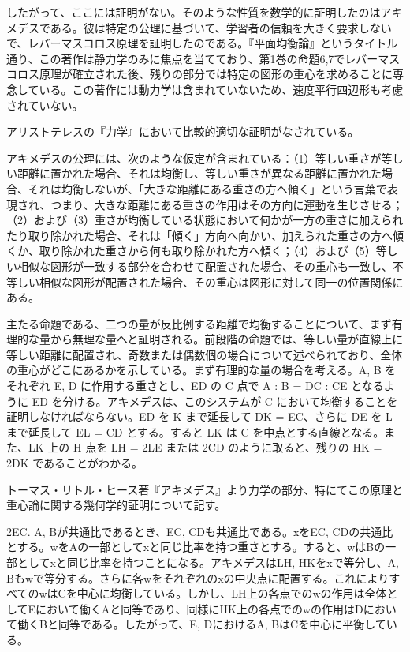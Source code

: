 \documentclass[a4paper,11pt,openany]{ltjsbook}
\begin{document}
したがって、ここには証明がない。そのような性質を数学的に証明したのはアキメデスである。彼は特定の公理に基づいて、学習者の信頼を大きく要求しないで、レバーマスコロス原理を証明したのである。『平面均衡論』というタイトル通り、この著作は静力学のみに焦点を当てており、第1巻の命題6,7でレバーマスコロス原理が確立された後、残りの部分では特定の図形の重心を求めることに専念している。この著作には動力学は含まれていないため、速度平行四辺形も考慮されていない。

アリストテレスの『力学』において比較的適切な証明がなされている。

アキメデスの公理には、次のような仮定が含まれている：（1）等しい重さが等しい距離に置かれた場合、それは均衡し、等しい重さが異なる距離に置かれた場合、それは均衡しないが、「大きな距離にある重さの方へ傾く」という言葉で表現され、つまり、大きな距離にある重さの作用はその方向に運動を生じさせる；（2）および（3）重さが均衡している状態において何かが一方の重さに加えられたり取り除かれた場合、それは「傾く」方向へ向かい、加えられた重さの方へ傾くか、取り除かれた重さから何も取り除かれた方へ傾く；（4）および（5）等しい相似な図形が一致する部分を合わせて配置された場合、その重心も一致し、不等しい相似な図形が配置された場合、その重心は図形に対して同一の位置関係にある。

主たる命題である、二つの量が反比例する距離で均衡することについて、まず有理的な量から無理な量へと証明される。前段階の命題では、等しい量が直線上に等しい距離に配置され、奇数または偶数個の場合について述べられており、全体の重心がどこにあるかを示している。まず有理的な量の場合を考える。A, B をそれぞれ E, D に作用する重さとし、ED の C 点で A : B = DC : CE となるように ED を分ける。アキメデスは、このシステムが C において均衡することを証明しなければならない。ED を K まで延長して DK = EC、さらに DE を L まで延長して EL = CD とする。すると LK は C を中点とする直線となる。また、LK 上の H 点を LH = 2LE または 2CD のように取ると、残りの HK = 2DK であることがわかる。

トーマス・リトル・ヒース著『アキメデス』より力学の部分、特にてこの原理と重心論に関する幾何学的証明について記す。

2EC. A, Bが共通比であるとき、EC, CDも共通比である。xをEC, CDの共通比とする。wをAの一部としてxと同じ比率を持つ重さとする。すると、wはBの一部としてxと同じ比率を持つことになる。アキメデスはLH, HKをxで等分し、A, Bもwで等分する。さらに各wをそれぞれのxの中央点に配置する。これによりすべてのwはCを中心に均衡している。しかし、LH上の各点でのwの作用は全体としてEにおいて働くAと同等であり、同様にHK上の各点でのwの作用はDにおいて働くBと同等である。したがって、E, DにおけるA, BはCを中心に平衡している。
\end{document}
